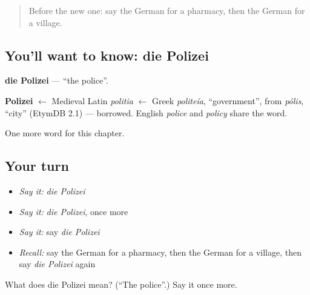 \label{lesson:GE-C97-polizei}



\begin{quote}
Before the new one: say the German for a pharmacy, then the German for a village.
\end{quote}

\subsection*{You'll want to know: die Polizei}
\textbf{die Polizei} — \textquotedblleft{}the police\textquotedblright{}.

\begin{cousinweb}
\textbf{Polizei} $\leftarrow$ Medieval Latin \emph{politia} $\leftarrow$ Greek \emph{politeía}, \textquotedblleft{}government\textquotedblright{}, from \emph{pólis}, \textquotedblleft{}city\textquotedblright{} (EtymDB 2.1) — borrowed. English \emph{police} and \emph{policy} share the word.
\end{cousinweb}

\begin{grammarlens}[title={What you've built}]
One more word for this chapter.
\end{grammarlens}

\subsection*{Your turn}
\begin{itemize}
\raggedright
  \item \emph{Say it:} \emph{die Polizei}
  \item \emph{Say it:} \emph{die Polizei}, once more
  \item \emph{Say it:} say \emph{die Polizei}
  \item \emph{Recall:} say the German for a pharmacy, then the German for a village, then say \emph{die Polizei} again
\end{itemize}

\begin{tcolorbox}[breakable,colback=teal!4,colframe=teal!35!black,title={Before you move on}]
What does die Polizei mean? (\textquotedblleft{}The police\textquotedblright{}.) Say it once more.
\end{tcolorbox}
